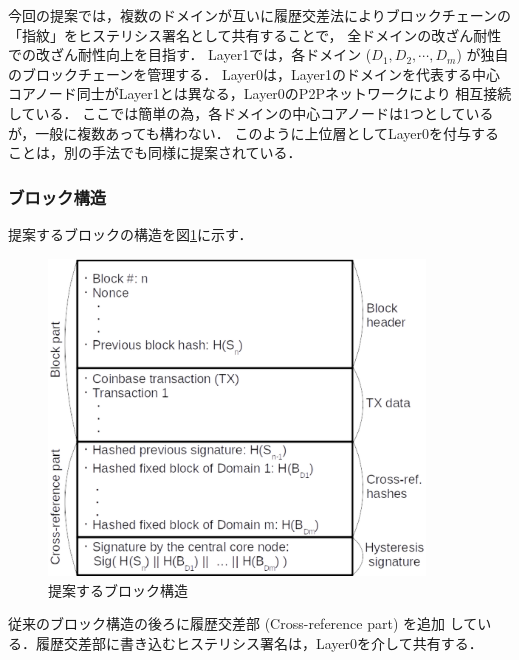 \documentclass[a4paper,12pt]{jsarticle}
\begin{document}
今回の提案では，複数のドメインが互いに履歴交差法によりブロックチェーンの「指紋」をヒステリシス署名として共有することで，
全ドメインの改ざん耐性での改ざん耐性向上を目指す．
Layer1では，各ドメイン ($D_1, D_2, \cdots, D_m$) が独自のブロックチェーンを管理する．
Layer0は，Layer1のドメインを代表する中心コアノード同士がLayer1とは異なる，Layer0のP2Pネットワークにより
相互接続している．
ここでは簡単の為，各ドメインの中心コアノードは1つとしているが，一般に複数あっても構わない．
このように上位層としてLayer0を付与することは，別の手法でも同様に提案されている\cite{bloX}．

      \subsubsection{ブロック構造}
提案するブロックの構造を図\ref{fig:block}に示す．
%
\begin{figure}[H]%
  \begin{center}
    \includegraphics[width=100mm]{pht/block_structure.eps}
  \end{center}
  \caption{提案するブロック構造}
  \label{fig:block}
\end{figure}
%
従来のブロック構造の後ろに履歴交差部 (Cross-reference part) を追加
している．履歴交差部に書き込むヒステリシス署名は，Layer0を介して共有する．
\end{document}
